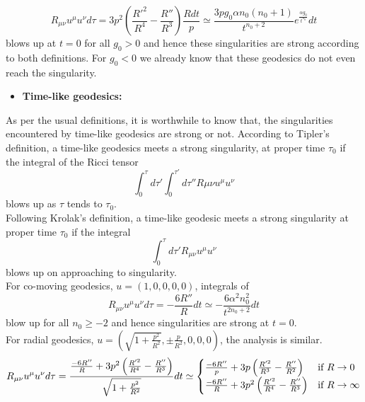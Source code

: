 \documentclass[11pt]{article}
\theoremstyle{theorem}
\theoremstyle{defi}
\begin{document}
\begin{equation}
\label{eqn39}
R_{\mu\nu}u^{\mu}u^{\nu}d\tau=3p^2\left(\frac{R'^2}{R^4}-\frac{R''}{R^3}\right)\frac{Rdt}{p}\simeq
\frac{3pg_0\alpha n_0(n_0+1)}{t^{n_0+2}}e^{\frac{\alpha g_0}{t^{n_0}}}dt
\end{equation}
blows up at $t=0$ for all $g_0>0$ and hence these singularities are strong according to both definitions. For $g_0<0$ we already know that
these geodesics do not even reach the singularity.
\begin{itemize}
\item \textbf{Time-like geodesics:}
\end{itemize}
 As per the usual definitions, it is worthwhile to know that, the singularities encountered by time-like geodesics are strong or not. According
to Tipler's definition, a time-like geodesics meets a strong singularity, at proper time $\tau_0$ if the integral of the Ricci tensor
\begin{equation}
\label{eqn40}
\int_0^{\tau}d\tau'\int_0^{\tau'}d\tau''R{\mu\nu}u^{\mu}u^{\nu}
\end{equation}
blows up as $\tau$ tends to $\tau_0$.\\
Following Krolak's definition, a time-like geodesic meets a strong singularity at proper time $\tau_0$ if the integral
\begin{equation}
\label{eqn41}
\int_0^{\tau}d\tau'R_{\mu\nu}u^{\mu}u^{\nu}
\end{equation}
blows up on approaching to singularity.\\
For co-moving geodesics, $u=(1, 0, 0, 0, 0)$, integrals of
\begin{equation}
\label{eqn42}
R_{\mu\nu}u^{\mu}u^{\nu}d\tau=-\frac{6R''}{R}dt\simeq-\frac{6\alpha^2 n_0^2}{t^{2n_0+2}}dt
\end{equation}
blow up for all $n_0\geq -2$ and hence singularities are strong at $t=0$.\\
For radial geodesics, $u=\left(\sqrt{1+\frac{p^2}{R^2}}, \pm\frac{p}{R^2}, 0, 0, 0\right)$, the analysis is similar.
\begin{equation}
\label{eqn43}
R_{\mu\nu}u^{\mu}u^{\nu}d\tau=\frac{\frac{-6R''}{R}+3p^2\left(\frac{R'^2}{R^4}-\frac{R''}{R^3}\right)}{\sqrt{1+\frac{p^2}{R^2}}}dt \\
\simeq\begin{cases}\frac{-6R''}{p}+3p\left(\frac{R'^2}{R^3}-\frac{R''}{R^2}\right) & \mbox{if  } R\rightarrow 0 \\
\frac{-6R''}{R}+3p^2\left(\frac{R'^2}{R^4}-\frac{R''}{R^3}\right)& \mbox{if  } R\rightarrow \infty
\end{cases}
\end{equation}
\end{document}
